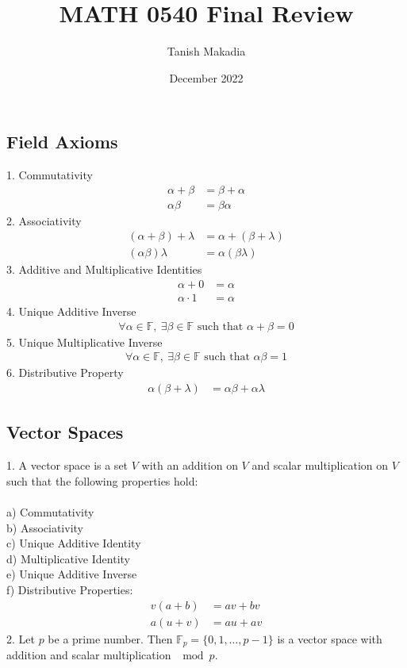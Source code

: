 \documentclass[11pt,reqno]{article}
\title{MATH 0540 Final Review}
\author{Tanish Makadia}
\date{December 2022}
\newcommand{\F}{\mathbb{F}}
\theoremstyle{definition}
\begin{document}
\maketitle


\newpage

\subsection*{Field Axioms}
1. Commutativity
\begin{align*}
    \alpha + \beta &= \beta + \alpha\\
    \alpha\beta &= \beta\alpha
\end{align*}
2. Associativity
\begin{align*}
    (\alpha + \beta) + \lambda &= \alpha + (\beta + \lambda)\\
    (\alpha\beta)\lambda &= \alpha(\beta\lambda)
\end{align*}
3. Additive and Multiplicative Identities
\begin{align*}
    \alpha + 0 &= \alpha\\
    \alpha \cdot 1 &= \alpha
\end{align*}
4. Unique Additive Inverse
\begin{align*}
    \forall \alpha\in\F,\ \exists\beta\in\F \text{ such that } \alpha + \beta = 0
\end{align*}
5. Unique Multiplicative Inverse
\begin{align*}
    \forall\alpha\in\F,\ \exists\beta\in\F \text{ such that } \alpha\beta = 1
\end{align*}
6. Distributive Property
\begin{align*}
    \alpha(\beta + \lambda) &= \alpha\beta + \alpha\lambda
\end{align*}

\subsection*{Vector Spaces} 
1. A vector space is a set $V$ with an addition on $V$ and scalar multiplication on $V$ such that the following properties hold:\\\\
\indent a) Commutativity\\
\indent b) Associativity\\
\indent c) Unique Additive Identity\\
\indent d) Multiplicative Identity\\
\indent e) Unique Additive Inverse\\
\indent f) Distributive Properties:
\begin{align*}
    v(a + b) &= av + bv\\
    a(u + v) &= au + av
\end{align*}
2. Let $p$ be a prime number. Then $\F_p = \{0, 1, \ldots, p-1\}$ is a vector space with addition and scalar multiplication $\mod p$.
\end{document}
